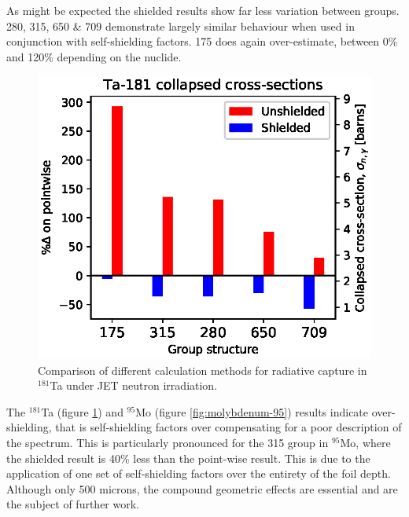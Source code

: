 As might be expected the shielded results show far less variation between groups. 280, 315, 650 \& 709 demonstrate largely similar behaviour when used in conjunction with self-shielding factors. 175 does again over-estimate, between 0\% and 120\% depending on the nuclide.

\begin{figure}[H]
  \centering
  \includegraphics[width=\linewidth]{Ta-181.eps}
  \caption{Comparison of different calculation methods for radiative capture in $^{181}$Ta under JET neutron irradiation.}
  \label{fig:tantalum-181}
\end{figure}

The $^{181}$Ta (figure \ref{fig:tantalum-181}) and $^{95}$Mo (figure \ref{fig:molybdenum-95}) results indicate over-shielding, that is self-shielding factors over compensating for a poor description of the spectrum. This is particularly pronounced for the 315 group in $^{95}$Mo, where the shielded result is 40\% less than the point-wise result. This is due to the application of one set of self-shielding factors over the entirety of the foil depth. Although only 500 microns, the compound geometric effects are essential and are the subject of further work.

